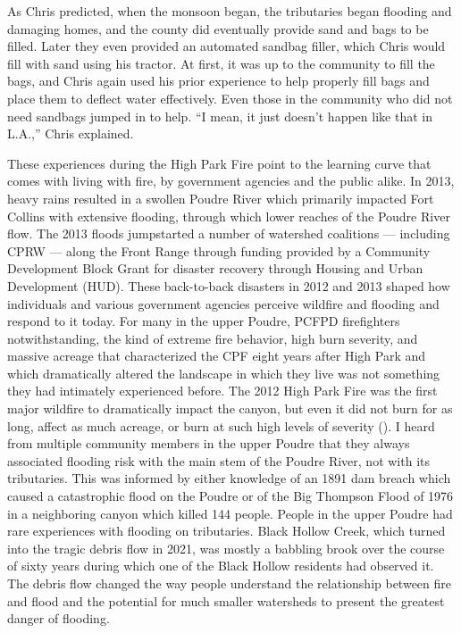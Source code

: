 \documentclass[
]{article}
\begin{document}
As Chris predicted, when the monsoon began, the tributaries began flooding and damaging homes, and the county did eventually provide sand and bags to be filled. Later they even provided an automated sandbag filler, which Chris would fill with sand using his tractor. At first, it was up to the community to fill the bags, and Chris again used his prior experience to help properly fill bags and place them to deflect water effectively. Even those in the community who did not need sandbags jumped in to help. ``I mean, it just doesn't happen like that in L.A.,'' Chris explained.

These experiences during the High Park Fire point to the learning curve that comes with living with fire, by government agencies and the public alike. In 2013, heavy rains resulted in a swollen Poudre River which primarily impacted Fort Collins with extensive flooding, through which lower reaches of the Poudre River flow. The 2013 floods jumpstarted a number of watershed coalitions --- including CPRW --- along the Front Range through funding provided by a Community Development Block Grant for disaster recovery through Housing and Urban Development (HUD). These back-to-back disasters in 2012 and 2013 shaped how individuals and various government agencies perceive wildfire and flooding and respond to it today. For many in the upper Poudre, PCFPD firefighters notwithstanding, the kind of extreme fire behavior, high burn severity, and massive acreage that characterized the CPF eight years after High Park and which dramatically altered the landscape in which they live was not something they had intimately experienced before. The 2012 High Park Fire was the first major wildfire to dramatically impact the canyon, but even it did not burn for as long, affect as much acreage, or burn at such high levels of severity (). I heard from multiple community members in the upper Poudre that they always associated flooding risk with the main stem of the Poudre River, not with its tributaries. This was informed by either knowledge of an 1891 dam breach which caused a catastrophic flood on the Poudre or of the Big Thompson Flood of 1976 in a neighboring canyon which killed 144 people. People in the upper Poudre had rare experiences with flooding on tributaries. Black Hollow Creek, which turned into the tragic debris flow in 2021, was mostly a babbling brook over the course of sixty years during which one of the Black Hollow residents had observed it. The debris flow changed the way people understand the relationship between fire and flood and the potential for much smaller watersheds to present the greatest danger of flooding.
\end{document}
